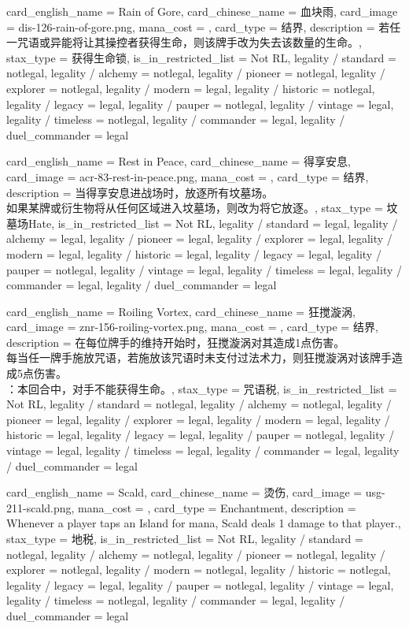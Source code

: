 \documentclass[lang = cn, color = black, 10pt]{AllThatStax}
\begin{document}
\card
{
	card_english_name = {Rain of Gore},
	card_chinese_name = {血块雨},
	card_image = dis-126-rain-of-gore.png,
	mana_cost = ,
	card_type = 结界,
	description = {若任一咒语或异能将让其操控者获得生命，则该牌手改为失去该数量的生命。},
	stax_type = 获得生命锁,
	is_in_restricted_list = Not RL,
	legality / standard = notlegal,
	legality / alchemy = notlegal,
	legality / pioneer = notlegal,
	legality / explorer = notlegal,
	legality / modern = legal,
	legality / historic = notlegal,
	legality / legacy = legal,
	legality / pauper = notlegal,
	legality / vintage = legal,
	legality / timeless = notlegal,
	legality / commander = legal,
	legality / duel_commander = legal
}

\card
{
	card_english_name = {Rest in Peace},
	card_chinese_name = {得享安息},
	card_image = acr-83-rest-in-peace.png,
	mana_cost = ,
	card_type = 结界,
	description = {当得享安息进战场时，放逐所有坟墓场。\\
		如果某牌或衍生物将从任何区域进入坟墓场，则改为将它放逐。},
	stax_type = 坟墓场Hate,
	is_in_restricted_list = Not RL,
	legality / standard = legal,
	legality / alchemy = legal,
	legality / pioneer = legal,
	legality / explorer = legal,
	legality / modern = legal,
	legality / historic = legal,
	legality / legacy = legal,
	legality / pauper = notlegal,
	legality / vintage = legal,
	legality / timeless = legal,
	legality / commander = legal,
	legality / duel_commander = legal
}

\card
{
	card_english_name = {Roiling Vortex},
	card_chinese_name = {狂搅漩涡},
	card_image = znr-156-roiling-vortex.png,
	mana_cost = ,
	card_type = 结界,
	description = {在每位牌手的维持开始时，狂搅漩涡对其造成1点伤害。\\
		每当任一牌手施放咒语，若施放该咒语时未支付过法术力，则狂搅漩涡对该牌手造成5点伤害。\\
		：本回合中，对手不能获得生命。},
	stax_type = 咒语税,
	is_in_restricted_list = Not RL,
	legality / standard = notlegal,
	legality / alchemy = notlegal,
	legality / pioneer = legal,
	legality / explorer = legal,
	legality / modern = legal,
	legality / historic = legal,
	legality / legacy = legal,
	legality / pauper = notlegal,
	legality / vintage = legal,
	legality / timeless = legal,
	legality / commander = legal,
	legality / duel_commander = legal
}

\card
{
	card_english_name = {Scald},
	card_chinese_name = {烫伤},
	card_image = usg-211-scald.png,
	mana_cost = ,
	card_type = Enchantment,
	description = {Whenever a player taps an Island for mana, Scald deals 1 damage to that player.},
	stax_type = 地税,
	is_in_restricted_list = Not RL,
	legality / standard = notlegal,
	legality / alchemy = notlegal,
	legality / pioneer = notlegal,
	legality / explorer = notlegal,
	legality / modern = notlegal,
	legality / historic = notlegal,
	legality / legacy = legal,
	legality / pauper = notlegal,
	legality / vintage = legal,
	legality / timeless = notlegal,
	legality / commander = legal,
	legality / duel_commander = legal
}
\end{document}
